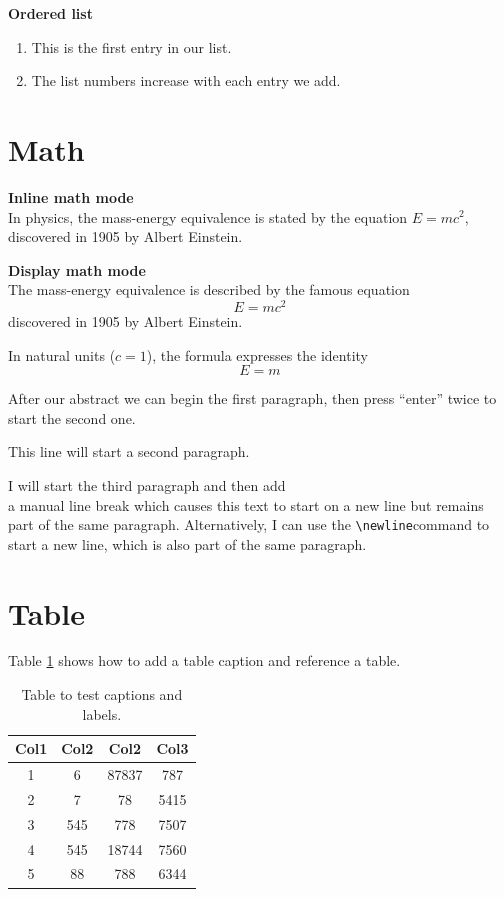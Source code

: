 \documentclass[12pt, letterpaper]{book}
\begin{document}
\textbf{Ordered list}
\begin{enumerate}
	\item This is the first entry in our list.
	\item The list numbers increase with each entry we add.
\end{enumerate}

\section{Math}

\textbf{Inline math mode\\}
In physics, the mass-energy equivalence is stated 
by the equation $E=mc^2$, discovered in 1905 by Albert Einstein.

\textbf{Display math mode\\}
The mass-energy equivalence is described by the famous equation
\[ E=mc^2 \] discovered in 1905 by Albert Einstein. 

In natural units ($c = 1$), the formula expresses the identity
\begin{equation}
E=m
\end{equation}

After our abstract we can begin the first paragraph, then press ``enter'' twice to start the second one.

This line will start a second paragraph.

I will start the third paragraph and then add \\ a manual line break which causes this text to start on a new line but remains part of the same paragraph. Alternatively, I can use the \verb|\newline|\newline command to start a new line, which is also part of the same paragraph.

\section{Table}

Table \ref{table:data} shows how to add a table caption and reference a table.

\begin{table}[ht!]
\centering
\begin{tabular}{c | c | c | c}
 Col1 & Col2 & Col2 & Col3 \\ [0.5ex]
 \hline
 1 & 6 & 87837 & 787 \\ 
 2 & 7 & 78 & 5415 \\
 3 & 545 & 778 & 7507 \\
 4 & 545 & 18744 & 7560 \\
 5 & 88 & 788 & 6344 \\ [1ex]
 \hline
\end{tabular}
\caption{Table to test captions and labels.}
\label{table:data}
\end{table}
\end{document}
